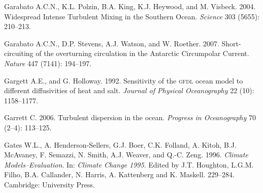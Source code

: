 \begin{thebibliography}{999}
Garabato A.C.N., K.L. Polzin, B.A. King, K.J. Heywood, and
M. Visbeck. 2004. Widespread Intense Turbulent Mixing in the Southern
Ocean. \textit{Science} 303 (5655): 210--213.
%

Garabato A.C.N., D.P. Stevens, A.J. Watson, and
W. Roether. 2007. Short-circuiting of the overturning circulation in
the Antarctic Circumpolar Current. \textit{Nature} 447 (7141):
194--197.
%

Gargett A.E., and G. Holloway.  1992. Sensitivity of the \textsc{gfdl}
ocean model to different diffusivities of heat and
salt. \textit{Journal of Physical Oceanography} 22 (10): 1158--1177.
%

Garrett C.  2006. Turbulent dispersion in the ocean. \textit{Progress
  in Oceanography} 70 (2--4): 113--125.
%

Gates W.L., A. Henderson-Sellers, G.J. Boer, C.K. Folland, A. Kitoh,
B.J. McAvaney, F. Semazzi, N. Smith, A.J. Weaver, and
Q.-C. Zeng. 1996. \textit{Climate Models--Evaluation}. In:
\textit{Climate Change 1995}. Edited by J.T. Houghton, L.G.M. Filho,
B.A. Callander, N. Harris, A. Kattenberg and K.
Maskell. 229--284. Cambridge: University Press.
%


\end{thebibliography}

